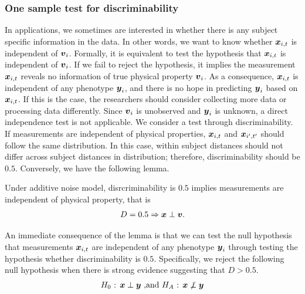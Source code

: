 \documentclass{article}
\begin{document}
\subsubsection{One sample test for discriminability}
In applications, we sometimes are interested in whether there is any subject specific information in the data. In other words, we want to know whether $\boldsymbol{x}_{i,t}$ is independent of $\boldsymbol{v}_i$. Formally, it is equivalent to test the hypothesis that $\boldsymbol{x}_{i,t}$ is independent of $\boldsymbol{v}_i$. If we fail to reject the hypothesis, it implies the measurement $\boldsymbol{x}_{i,t}$ reveals no information of true physical property $\boldsymbol{v}_i$. As a consequence, $\boldsymbol{x}_{i,t}$ is independent of any phenotype $\boldsymbol{y}_i$, and there is no hope in predicting $\boldsymbol{y}_i$ based on $\boldsymbol{x}_{i,t}$. If this is the case, the researchers should consider collecting more data or processing data differently. Since $\boldsymbol{v}_i$ is unobserved and $\boldsymbol{y}_i$ is unknown, a direct independence test is not applicable. We consider a test through discriminability. If measurements are independent of physical properties, $\boldsymbol{x}_{i,t}$ and $\boldsymbol{x}_{i',t'}$ should follow the same distribution. In this case, within subject distances should not differ across subject distances in distribution; therefore, discriminability should be $0.5$. Conversely, we have the following lemma.
\begin{lem}	
	Under additive noise model, disrcriminability is $0.5$ implies measurements are independent of physical property, that is 
	\[D=0.5 \Rightarrow \boldsymbol{x} \perp \boldsymbol{v}  .  \]
	\label{lem:lem3}
\end{lem}
An immediate consequence of the lemma is that we can test the null hypothesis that measurements $\boldsymbol{x}_{i,t}$ are independent of any phenotype $\boldsymbol{y}_i$ through testing the hypothesis whether discriminability is $0.5$. Specifically, we reject the following null hypothesis when there is strong evidence suggesting that $D > 0.5$.
\[ H_0 \text{ : } \boldsymbol{x} \perp \boldsymbol{y} \text{ ,and } H_A \text{ : } \boldsymbol{x} \not\perp \boldsymbol{y} \]
\end{document}
